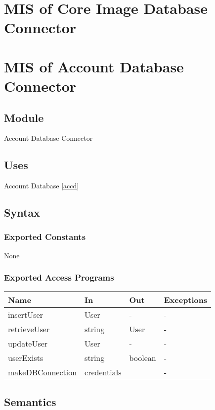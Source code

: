 \documentclass[12pt, titlepage]{article}
\begin{document}
\section{MIS of Core Image Database Connector} \label{cidbc} 



\section{MIS of Account Database Connector} \label{accdc}

\subsection{Module}

Account Database Connector

\subsection{Uses}

Account Database \ref{accd}

\subsection{Syntax}

\subsubsection{Exported Constants}
None
\subsubsection{Exported Access Programs}

\begin{center}
\begin{tabular}{p{2cm} p{4cm} p{4cm} p{2cm}}
\hline
\textbf{Name} & \textbf{In} & \textbf{Out} & \textbf{Exceptions} \\
\hline
insertUser & User & - & - \\
retrieveUser & string & User & - \\
updateUser & User & - & - \\
userExists & string & boolean & - \\
makeDBConnection & credentials & & - \\
\hline
\end{tabular}
\end{center}

\subsection{Semantics}
\end{document}
